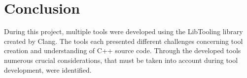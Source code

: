 \chapter{Conclusion}

During this project, multiple tools were developed using the LibTooling library created by Clang. 
The tools each presented different challenges concerning tool creation and understanding of C++ source code. 
Through the developed tools numerous crucial considerations, that must be taken into account during tool development, were identified.